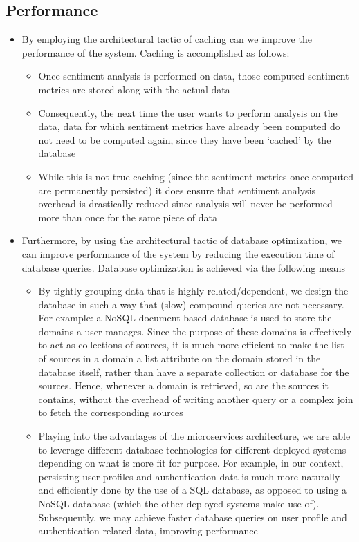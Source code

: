 \documentclass[12pt]{article}
\begin{document}
\subsection*{Performance}
\begin{itemize}
  \item By employing the architectural tactic of caching can we improve the performance of the system. Caching is accomplished as follows:
  \begin{itemize}
    \item Once sentiment analysis is performed on data, those computed sentiment metrics are stored along with the actual data
    \item Consequently, the next time the user wants to perform analysis on the data, data for which sentiment metrics have already been computed do not need to be computed again, since they have been ‘cached’ by the database
    \item While this is not true caching (since the sentiment metrics once computed are permanently persisted) it does ensure that sentiment analysis overhead is drastically reduced since analysis will never be performed more than once for the same piece of data
  \end{itemize}
  \item Furthermore, by using the architectural tactic of database optimization, we can improve performance of the system by reducing the execution time of database queries. Database optimization is achieved via the following means
  \begin{itemize}
    \item By tightly grouping data that is highly related/dependent, we design the database in such a way that (slow) compound queries are not necessary. For example: a NoSQL document-based database is used to store the domains a user manages. Since the purpose of these domains is effectively to act as collections of sources, it is much more efficient to make the list of sources in a domain a list attribute on the domain stored in the database itself, rather than have a separate collection or database for the sources. Hence, whenever a domain is retrieved, so are the sources it contains, without the overhead of writing another query or a complex join to fetch the corresponding sources
    \item Playing into the advantages of the microservices architecture, we are able to leverage different database technologies for different deployed systems depending on what is more fit for purpose. For example, in our context, persisting user profiles and authentication data is much more naturally and efficiently done by the use of a SQL database, as opposed to using a NoSQL database (which the other deployed systems make use of). Subsequently, we may achieve faster database queries on user profile and authentication related data, improving performance
  \end{itemize}

\end{itemize}
\end{document}
